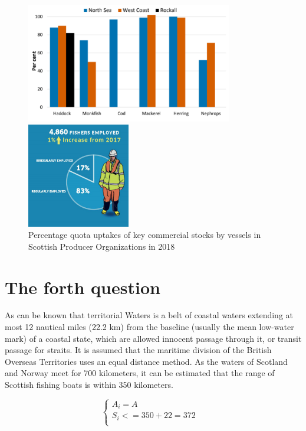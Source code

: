 \documentclass{mcmthesis}
\begin{document}
			\begin{figure}[htbp]
				\centering
				\begin{minipage}[c]{0.5\textwidth}
					\centering
					\includegraphics[width=9cm]{./picture/figure5.png}
				\end{minipage}%
				\begin{minipage}[c]{0.5\textwidth}
					\centering
					\includegraphics[width=4.5cm]{./picture/figure6.png}
				\end{minipage}
				\caption{Percentage quota uptakes of key commercial stocks by vessels in Scottish Producer Organizations in 2018}
			\end{figure}

\section{The forth question}
As can be known that territorial Waters is a belt of coastal waters extending at most 12 nautical miles (22.2 km) from the baseline (usually the mean low-water mark) of a coastal state, which are allowed innocent passage through it, or transit passage for straits.
It is assumed that the maritime division of the British Overseas Territories uses an equal distance method. As the waters of Scotland and Norway meet for 700 kilometers, it can be estimated that the range of Scottish fishing boats is within 350 kilometers.

\begin{equation}
\left\{
\begin{array}{lr}
A_i=A &\\
S_i<= 350+22 =372 \\
\end{array}
\right.
\end{equation}
\end{document}
